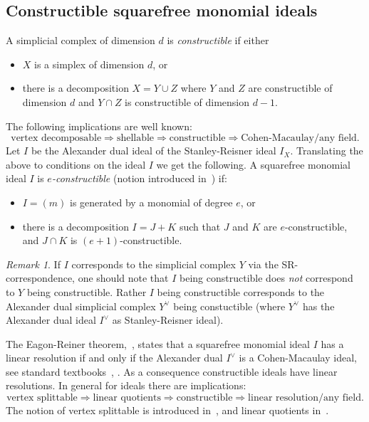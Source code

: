 \documentclass[10pt,a4paper]{article}
\theoremstyle{definition}
\theoremstyle{remark}
\newtheorem{rema}[cdrthm]{Remark}
\theoremstyle{plain}
\begin{document}
\subsection{Constructible squarefree monomial ideals}
\label{subsec:pre-const}
A simplicial complex of dimension $d$ is {\it constructible} if either
\begin{itemize}
\item $X$ is a simplex of dimension $d$, or
\item there is a decomposition $X = Y \cup Z$ where $Y$ and $Z$
  are constructible of dimension $d$ and $Y \cap Z$ is constructible
  of dimension $d-1$.
\end{itemize}
The following implications are well known:
\[ \text{vertex decomposable} \Rightarrow
  \text{shellable} \Rightarrow \text{constructible} \Rightarrow
  \text{Cohen-Macaulay/any field}. \]
Let $I$ be the Alexander dual ideal of the Stanley-Reisner ideal $I_X$.
Translating the above to conditions on the ideal $I$ we get the following.
A squarefree monomial ideal $I$ is {\it $e$-constructible}
(notion introduced in~\cite{Olt-Const}) if:
\begin{itemize}
\item $I = (m)$ is generated by a monomial of degree $e$, or
\item there is a decomposition $I = J + K$ such that $J$ and $K$
  are $e$-constructible, and $J \cap K$ is $(e+1)$-constructible.
\end{itemize}

\begin{rema} If $I$ corresponds to the simplicial complex $Y$ via
  the SR-correspondence, one should note that $I$ being constructible
  does {\it not} correspond to $Y$ being constructible. Rather $I$ being
  constructible corresponds to 
  the Alexander dual simplicial complex $Y^\vee$ being constuctible
  (where  $Y^\vee$ has the Alexander dual ideal $I^\vee$ as
  Stanley-Reisner ideal).
\end{rema}

The Eagon-Reiner theorem,~\cite{ER98}, states that a squarefree
monomial ideal $I$ has a linear resolution if and only if the Alexander dual $I^\vee$
is a Cohen-Macaulay ideal, see standard textbooks~\cite[Thm.~8.1.9]{HeHi},
\cite[Thm.~5.56]{MiSt}.
As a consequence constructible ideals have linear resolutions.
In general for ideals there are implications:
\[  \text{vertex splittable} \Rightarrow
  \text{linear quotients} \Rightarrow \text{constructible} \Rightarrow
  \text{linear resolution/any field}. \]
The notion of vertex splittable is introduced in~\cite{MoKa}, and
linear quotients in~\cite{HT-cones}.
\end{document}
